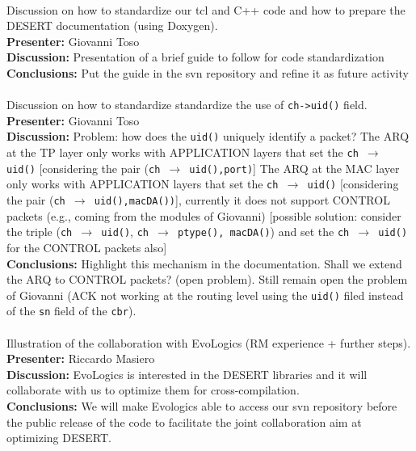 \documentclass[11pt,journal,draftclsnofoot,onecolumn,twoside,letterpaper]{IEEEtran}
\theoremstyle{definition} \newtheorem{definition}[]{Definition}
\theoremstyle{theorem} \newtheorem{theorem}[]{Theorem}
\begin{document}
\  \\
 Discussion on how to standardize our tcl and C++ code and how to prepare the DESERT documentation (using Doxygen).\\
{\bf Presenter:} Giovanni Toso\\
{\bf Discussion:} Presentation of a brief guide to follow for code standardization\\
{\bf Conclusions:} Put the guide in the svn repository and refine it as future activity\\  

\  \\
 Discussion on how to standardize standardize the use of {\tt ch->uid()} field.\\
{\bf Presenter:} Giovanni Toso\\
{\bf Discussion:} Problem: how does the {\tt uid()} uniquely identify a packet?
The ARQ at the TP layer only works with APPLICATION layers that set the {\tt ch $\rightarrow$ uid()} [considering the pair ({\tt ch $\rightarrow$ uid(),port)}]
The ARQ at the MAC layer only works with APPLICATION layers that set the {\tt ch $\rightarrow$ uid()} [considering the pair ({\tt ch $\rightarrow$ uid(),macDA())}], currently it does not support CONTROL packets (e.g., coming from the modules of Giovanni) [possible solution: consider the triple ({\tt ch $\rightarrow$ uid()}, {\tt ch $\rightarrow$ ptype(), macDA()}) and set the {\tt ch $\rightarrow$ uid()} for the CONTROL packets also] \\
{\bf Conclusions:} Highlight this mechanism in the documentation. Shall we extend the ARQ to CONTROL packets? (open problem). Still remain open the problem of Giovanni (ACK not working at the routing level using the {\tt uid()} filed instead of the {\tt sn} field of the {\tt cbr}). \\  

\  \\
 Illustration of the collaboration with EvoLogics (RM experience + further steps).\\
{\bf Presenter:} Riccardo Masiero\\
{\bf Discussion:} EvoLogics is interested in the DESERT libraries and it will collaborate with us to optimize them for cross-compilation.\\
{\bf Conclusions:} We will make Evologics able to access our svn repository before the public release of the code to facilitate the joint collaboration aim at optimizing DESERT.\\  
\end{document}
